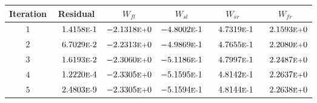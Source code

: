\begin{tabular*}{\textwidth}{@{\extracolsep{\fill}} cccccc}
\\ 
\hline 
\hline 
Iteration & Residual & $W_{fl}$ & $W_{sl}$ & $W_{sr}$ & $W_{fr}$ \\ 
\hline 
$1$ & $\phantom{-} 1.4158\mbox{\sc{e}\smaller{-}}1$ & $-2.1318\mbox{\sc{e}\smaller{+}}0$ & $-4.8002\mbox{\sc{e}\smaller{-}}1$ & $\phantom{-} 4.7319\mbox{\sc{e}\smaller{-}}1$ & $\phantom{-} 2.1593\mbox{\sc{e}\smaller{+}}0$ \\ 
$2$ & $\phantom{-} 6.7029\mbox{\sc{e}\smaller{-}}2$ & $-2.2313\mbox{\sc{e}\smaller{+}}0$ & $-4.9869\mbox{\sc{e}\smaller{-}}1$ & $\phantom{-} 4.7655\mbox{\sc{e}\smaller{-}}1$ & $\phantom{-} 2.2080\mbox{\sc{e}\smaller{+}}0$ \\ 
$3$ & $\phantom{-} 1.6193\mbox{\sc{e}\smaller{-}}2$ & $-2.3060\mbox{\sc{e}\smaller{+}}0$ & $-5.1186\mbox{\sc{e}\smaller{-}}1$ & $\phantom{-} 4.7997\mbox{\sc{e}\smaller{-}}1$ & $\phantom{-} 2.2487\mbox{\sc{e}\smaller{+}}0$ \\ 
$4$ & $\phantom{-} 1.2220\mbox{\sc{e}\smaller{-}}4$ & $-2.3305\mbox{\sc{e}\smaller{+}}0$ & $-5.1595\mbox{\sc{e}\smaller{-}}1$ & $\phantom{-} 4.8142\mbox{\sc{e}\smaller{-}}1$ & $\phantom{-} 2.2637\mbox{\sc{e}\smaller{+}}0$ \\ 
$5$ & $\phantom{-} 2.4803\mbox{\sc{e}\smaller{-}}9$ & $-2.3305\mbox{\sc{e}\smaller{+}}0$ & $-5.1594\mbox{\sc{e}\smaller{-}}1$ & $\phantom{-} 4.8144\mbox{\sc{e}\smaller{-}}1$ & $\phantom{-} 2.2638\mbox{\sc{e}\smaller{+}}0$ \\ 
\hline 
\end{tabular*} 
